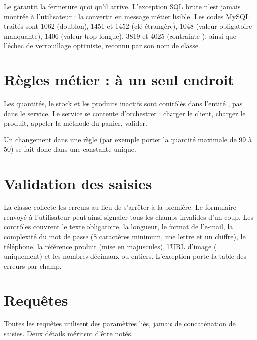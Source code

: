 

Le  garantit la fermeture quoi qu'il arrive. L'exception SQL brute n'est jamais montrée à
l'utilisateur :  la convertit en message métier lisible. Les codes MySQL traités sont
1062 (doublon), 1451 et 1452 (clé étrangère), 1048 (valeur obligatoire manquante), 1406 (valeur trop longue), 3819 et
4025 (contrainte ), ainsi que l'échec de verrouillage optimiste, reconnu par son nom de classe.

\section{Règles métier : à un seul endroit}
Les quantités, le stock et les produits inactifs sont contrôlés dans l'entité , pas dans le service.
Le service se contente d'orchestrer : charger le client, charger le produit, appeler la méthode du panier, valider.



Un changement dans une règle (par exemple porter la quantité maximale de 99 à 50) se fait donc dans une constante unique.

\section{Validation des saisies}
La classe  collecte les erreurs au lieu de s'arrêter à la première. Le formulaire renvoyé à l'utilisateur
peut ainsi signaler tous les champs invalides d'un coup. Les contrôles couvrent le texte obligatoire, la longueur, le
format de l'e-mail, la complexité du mot de passe (8 caractères minimum, une lettre et un chiffre), le téléphone, la
référence produit (mise en majuscules), l'URL d'image ( uniquement) et les nombres décimaux ou entiers.
L'exception  porte la table des erreurs par champ.

\section{Requêtes}
Toutes les requêtes utilisent des paramètres liés, jamais de concaténation de saisies. Deux détails méritent d'être notés.

